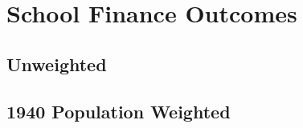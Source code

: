 \documentclass{article}
\begin{document}
%
%
%
%
%
%
%
%
%
%
%
%
%
%
%
%


\section{School Finance Outcomes}
\subsection{Unweighted}


\clearpage
\subsection{1940 Population Weighted}


\clearpage
\end{document}
